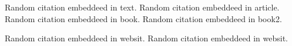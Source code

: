 \documentclass{article}
\begin{document}
Random citation \cite{DUMMY:1} embeddeed in text.
Random citation \cite{ARTICLE:1} embeddeed in article.
Random citation \cite{BOOK:1} embeddeed in book.
Random citation \cite{BOOK:2} embeddeed in book2.


Random citation \cite{WEBSITE:1} embeddeed in websit.
Random citation \cite{wiki:xxx} embeddeed in websit.

\newpage

 

\end{document}
